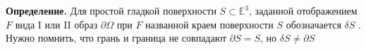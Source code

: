 \textbf{Определение.} Для простой гладкой поверхности $ S\subset\mathbb{E}^3 $, заданной отображением $ F $ вида I или II образ $ \partial \Omega $ при $ F $ названной краем поверхности $  S $ обозначается $ \delta S $ . Нужно помнить, что грань и граница не совпадают $ \partial S = S$, но $ \delta S \neq \partial S $